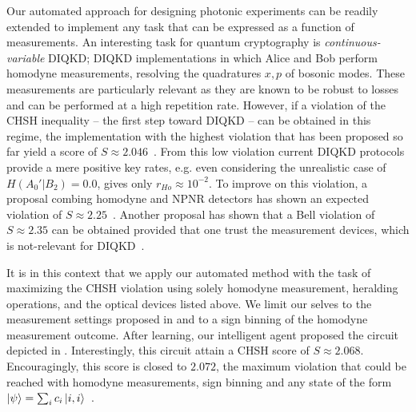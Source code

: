 Our automated approach for designing photonic experiments can be readily extended to implement any task that can be expressed as a function of measurements.
An interesting task for quantum cryptography is \textit{continuous-variable} DIQKD; DIQKD implementations in which Alice and Bob perform homodyne measurements, resolving the quadratures $x,p$ of bosonic modes.
These measurements are particularly relevant as they are known to be robust to losses and can be performed at a high repetition rate.
However, if a violation of the CHSH inequality -- the first step toward DIQKD -- can be obtained in this regime, the implementation with the highest violation that has been proposed so far yield a score of $S \approx 2.046$~\cite{GarciaPatron2004,GarciaPatron2005}.
From this low violation current DIQKD protocols provide a mere positive key rates, e.g. even considering the unrealistic case of $H(A_0'|B_2)=0.0$,  gives only $r_{Ho}\approx 10^{-2}$.
To improve on this violation, a proposal combing homodyne and NPNR detectors has shown an expected violation of $S\approx 2.25$~\cite{Cavalcanti2011}.
Another proposal has shown that a Bell violation of $S \approx 2.35$ can be obtained provided that one trust the measurement devices, which is not-relevant for DIQKD~\cite{Thearle2018}.

It is in this context that we apply our automated method with the task of maximizing the CHSH violation using solely homodyne measurement, heralding operations, and the optical devices listed above.
We limit our selves to the measurement settings proposed in \cite{GarciaPatron2005} and to a sign binning of the homodyne measurement outcome.
After learning, our intelligent agent proposed the circuit depicted in . 
Interestingly, this circuit attain a CHSH score of $S\approx 2.068$. 
Encouragingly, this score is closed to $2.072$, the maximum violation that could be reached with homodyne measurements, sign binning and any state of the form $\ket{\psi}=\sum_i c_i \ket{i,i}$~\cite{Munro1999}.

